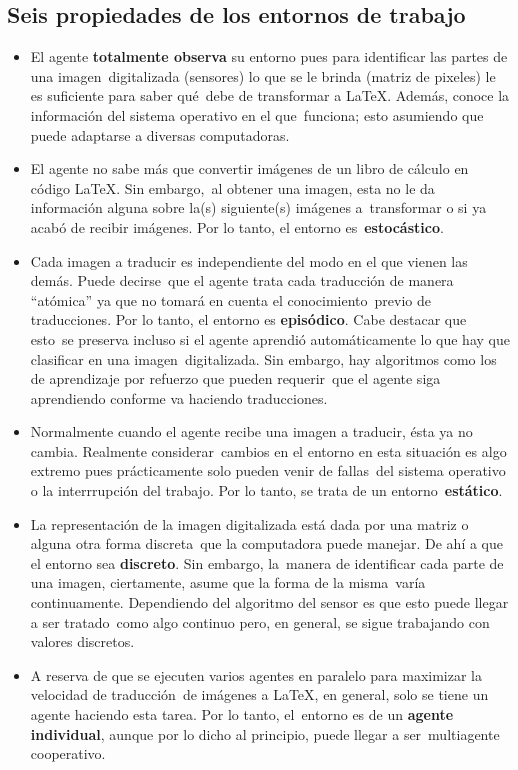 \documentclass[paper=letter, fontsize=12pt]{scrartcl} %
\numberwithin{equation}{section} %
\numberwithin{figure}{section} %
\numberwithin{table}{section} %
\begin{document}
\subsection{Seis propiedades de los entornos de trabajo}

\begin{itemize}
\item El agente \textbf{totalmente observa} su entorno pues para identificar las partes de una imagen\
  digitalizada (sensores) lo que se le brinda (matriz de pixeles) le es suficiente para saber qué\
  debe de transformar a \LaTeX. Además, conoce la información del sistema operativo en el que\
  funciona; esto asumiendo que puede adaptarse a diversas computadoras.
\item El agente no sabe más que convertir imágenes de un libro de cálculo en código \LaTeX. Sin embargo,\
  al obtener una imagen, esta no le da información alguna sobre la(s) siguiente(s) imágenes a\
  transformar o si ya acabó de recibir imágenes. Por lo tanto, el entorno es\
  \textbf{estocástico}.
\item Cada imagen a traducir es independiente del modo en el que vienen las demás. Puede decirse\
  que el agente trata cada traducción de manera ``atómica'' ya que no tomará en cuenta el conocimiento\
  previo de traducciones. Por lo tanto, el entorno es \textbf{episódico}. Cabe destacar que esto\
  se preserva incluso si el agente aprendió automáticamente lo que hay que clasificar en una imagen\
  digitalizada. Sin embargo, hay algoritmos como los de aprendizaje por refuerzo que pueden requerir\
  que el agente siga aprendiendo conforme va haciendo traducciones.
\item Normalmente cuando el agente recibe una imagen a traducir, ésta ya no cambia. Realmente considerar\
  cambios en el entorno en esta situación es algo extremo pues prácticamente solo pueden venir de fallas\
  del sistema operativo o la interrrupción del trabajo. Por lo tanto, se trata de un entorno\
  \textbf{estático}.
\item La representación de la imagen digitalizada está dada por una matriz o alguna otra forma discreta\
  que la computadora puede manejar. De ahí a que el entorno sea \textbf{discreto}. Sin embargo, la\
  manera de identificar cada parte de una imagen, ciertamente, asume que la forma de la misma\
  varía continuamente. Dependiendo del algoritmo del sensor es que esto puede llegar a ser tratado\
  como algo continuo pero, en general, se sigue trabajando con valores discretos.
\item A reserva de que se ejecuten varios agentes en paralelo para maximizar la velocidad de traducción\
  de imágenes a \LaTeX, en general, solo se tiene un agente haciendo esta tarea. Por lo tanto, el\
  entorno es de un \textbf{agente individual}, aunque por lo dicho al principio, puede llegar a ser\
  multiagente cooperativo.
\end{itemize}
\end{document}
